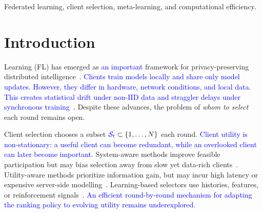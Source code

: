 \documentclass[journal]{IEEEtran}
\newcommand{\revision}[1]{\textcolor{blue}{#1}}
\begin{document}
\renewcommand\IEEEkeywordsname{Index Terms}
\begin{IEEEkeywords}
Federated learning, client selection, meta-learning, and computational efficiency.
\end{IEEEkeywords}
\section{Introduction}

 Learning (FL) has emerged as \revision{an important} framework for privacy-preserving distributed intelligence~\cite{mcmahan2017communication}. \revision{Clients train models locally and share only model updates. However, they differ in hardware, network conditions, and local data. This creates statistical drift under non-IID data and straggler delays under synchronous training}~\cite{karimireddy2020scaffold,mai2024study,tapwal2026stragglers,forootani2026asynchronous,borazjani2026redefining}. Despite these advances, the problem of \textit{whom to select} each round remains open.

Client selection chooses a subset $\revision{\mathcal{S}_t} \subset \{1, \ldots, N\}$ each round. \revision{Client utility is non-stationary: a useful client can become redundant, while an overlooked client can later become important.} System-aware methods improve feasible participation but may bias selection away from slow yet data-rich clients~\cite{nishio2019client,chai2020tifl}. Utility-aware methods prioritize information gain, but may incur high latency or expensive server-side modelling~\cite{lai2021oort,tang2022fedcor,xu2024federated,yan2023criticalfl,ning2024fedgcs}. Learning-based selectors use histories, features, or reinforcement signals~\cite{wang2020optimizing,pan2024contextual,kazemi2026robust}. \revision{An efficient round-by-round mechanism for adapting the ranking policy to evolving utility remains underexplored.}
\end{document}
